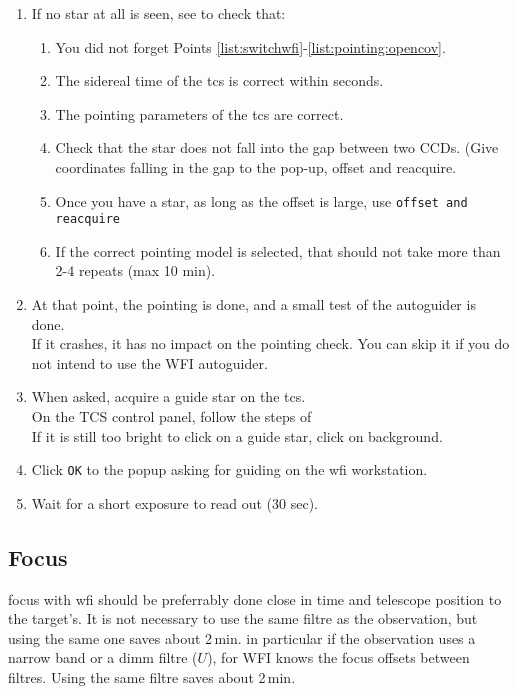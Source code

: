 \documentclass[11pt,fleqn,a4paper]{book}
\begin{document}
\begin{enumerate}
  \item If no star at all is seen, see 
     to check that:
    \begin{enumerate}
      \item You did not forget Points \ref{list:switchwfi}-\ref{list:pointing:opencov}.
      \item The sidereal time of the \gls{tcs} is correct within seconds.
      \item The pointing parameters of the \gls{tcs} are correct.
      \item Check that the star does not fall into the gap between two CCDs. (Give coordinates falling in the gap to the pop-up, offset and reacquire. 
      \item Once you have a star, as long as the offset is large, use \texttt{offset and reacquire}
      \item If the correct \gls{pointing model} is selected, that should not take more than 2-4 repeats (max 10 min).
    \end{enumerate}
  \item At that point, the \gls{pointing} is done, and a small test of the
        autoguider is done.\\
        If it crashes, it has no impact on the \gls{pointing}
        check.  You can skip it if you do not intend to use the WFI autoguider.
  \item When asked, acquire a guide star on the \gls{tcs}.\\
        On the \gls{TCS control panel}, follow the steps of \\
        If it is still too bright to click on a guide star, click on background.
  \item Click \texttt{OK} to the popup asking for guiding on the \gls{wfi} workstation.
  \item Wait for a short exposure to read out (30 sec).
\end{enumerate}

\subsection{Focus}

\gls{focus} with \gls{wfi} should be preferrably done close in time and telescope position to the target's.  It is not necessary to use the same filtre as the observation, but using the same one saves about 2\,min. in particular if the observation uses a narrow band or a dimm filtre ($U$), for WFI knows the focus offsets between filtres.  Using the same filtre saves about 2\,min. 
\end{document}
